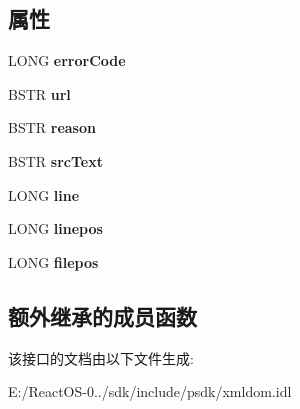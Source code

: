 \subsection*{属性}
\begin{DoxyCompactItemize}
\item 
\mbox{\label{interface_i_x_m_l_d_o_m_parse_error_aeb159649e3d36b5908bfb918d454c7c4}} 
L\+O\+NG {\bfseries error\+Code}
\item 
\mbox{\label{interface_i_x_m_l_d_o_m_parse_error_a800ffb107848b302cd9f7413bd36d8dc}} 
B\+S\+TR {\bfseries url}
\item 
\mbox{\label{interface_i_x_m_l_d_o_m_parse_error_ab35a26ae3ea642ab680cea836ee17e2f}} 
B\+S\+TR {\bfseries reason}
\item 
\mbox{\label{interface_i_x_m_l_d_o_m_parse_error_a302b4a7a4bdbae59b8f8d3cc1d8f8860}} 
B\+S\+TR {\bfseries src\+Text}
\item 
\mbox{\label{interface_i_x_m_l_d_o_m_parse_error_a0bc786f6c456307e490fac0df961b49c}} 
L\+O\+NG {\bfseries line}
\item 
\mbox{\label{interface_i_x_m_l_d_o_m_parse_error_a9ab532c16e1d64b4b90ceaac5d0a4428}} 
L\+O\+NG {\bfseries linepos}
\item 
\mbox{\label{interface_i_x_m_l_d_o_m_parse_error_afd12df7a917e0dbd27630e447064a0e2}} 
L\+O\+NG {\bfseries filepos}
\end{DoxyCompactItemize}
\subsection*{额外继承的成员函数}


该接口的文档由以下文件生成\+:\begin{DoxyCompactItemize}
\item 
E\+:/\+React\+O\+S-\/0../sdk/include/psdk/xmldom.\+idl\end{DoxyCompactItemize}
